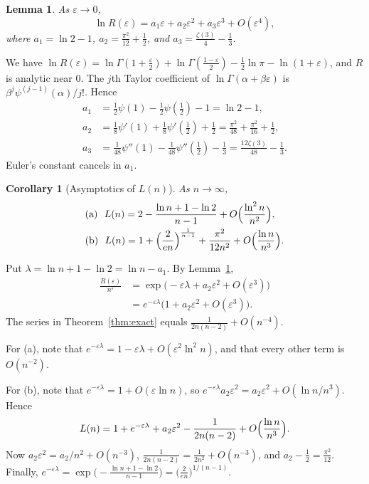 \documentclass[journal]{IEEEtran}
\newtheorem{lemma}{Lemma}
\newtheorem{corollary}{Corollary}
\newcommand{\eps}{\varepsilon}
\begin{document}
\begin{lemma}\label{lem:logR}
As $\eps\to0$,
\[
  \ln R(\eps)=a_1\eps+a_2\eps^2+a_3\eps^3+O(\eps^4),
\]
where $a_1=\ln2-1$, $a_2=\frac{\pi^2}{12}+\frac12$, and $a_3=\frac{\zeta(3)}{4}-\frac13$.
\end{lemma}

\begin{IEEEproof}
We have $\ln R(\eps)=\ln\Gamma(1+\frac\eps2)+\ln\Gamma(\frac{1-\eps}{2})-\frac12\ln\pi
-\ln(1+\eps)$, and $R$ is analytic near $0$. The $j$th Taylor coefficient of
$\ln\Gamma(\alpha+\beta\eps)$ is $\beta^j\psi^{(j-1)}(\alpha)/j!$. Hence
\begin{align*}
  a_1&=\tfrac12\psi(1)-\tfrac12\psi(\tfrac12)-1=\ln2-1,\\
  a_2&=\tfrac18\psi'(1)+\tfrac18\psi'(\tfrac12)+\tfrac12=\tfrac{\pi^2}{48}+\tfrac{\pi^2}{16}+\tfrac12,\\
  a_3&=\tfrac1{48}\psi''(1)-\tfrac1{48}\psi''(\tfrac12)-\tfrac13=\tfrac{12\zeta(3)}{48}-\tfrac13.
\end{align*}
Euler's constant cancels in $a_1$.
\end{IEEEproof}

\begin{corollary}[Asymptotics of $L(n)$]\label{cor:asymp}
As $n\to\infty$,
\begin{align*}
  &\text{(a)}\ \ L(n)=2-\frac{\ln n+1-\ln2}{n-1}+O\Bigl(\frac{\ln^2n}{n^2}\Bigr),\\
  &\text{(b)}\ \ L(n)=1+\Bigl(\frac{2}{en}\Bigr)^{\frac{1}{n-1}}+\frac{\pi^2}{12n^2}
    +O\Bigl(\frac{\ln n}{n^3}\Bigr).
\end{align*}
\end{corollary}

\begin{IEEEproof}
Put $\lambda=\ln n+1-\ln2=\ln n-a_1$. By Lemma~\ref{lem:logR},
\begin{align*}
  \frac{R(\eps)}{n^{\eps}}&=\exp\bigl(-\eps\lambda+a_2\eps^2+O(\eps^3)\bigr)\\
  &=e^{-\eps\lambda}\bigl(1+a_2\eps^2+O(\eps^3)\bigr).
\end{align*}
The series in Theorem~\ref{thm:exact} equals $\frac{1}{2n(n-2)}+O(n^{-4})$.

For (a), note that $e^{-\eps\lambda}=1-\eps\lambda+O(\eps^2\ln^2n)$, and that every other term
is $O(n^{-2})$.

For (b), note that $e^{-\eps\lambda}=1+O(\eps\ln n)$, so
$e^{-\eps\lambda}a_2\eps^2=a_2\eps^2+O(\ln n/n^3)$. Hence
\[
  L(n)=1+e^{-\eps\lambda}+a_2\eps^2-\frac{1}{2n(n-2)}+O\Bigl(\frac{\ln n}{n^3}\Bigr).
\]
Now $a_2\eps^2=a_2/n^2+O(n^{-3})$, $\frac{1}{2n(n-2)}=\frac{1}{2n^2}+O(n^{-3})$, and
$a_2-\frac12=\frac{\pi^2}{12}$. Finally,
$e^{-\eps\lambda}=\exp\bigl(-\frac{\ln n+1-\ln2}{n-1}\bigr)=\bigl(\frac{2}{en}\bigr)^{1/(n-1)}$.
\end{IEEEproof}
\end{document}
